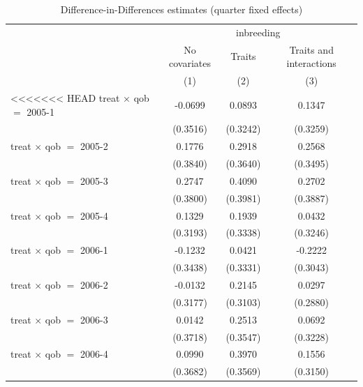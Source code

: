
\begin{table}[htbp]
   \caption{\label{tab:table3} Difference-in-Differences estimates (quarter fixed effects)}
   \bigskip
   \centering
   \begin{tabular}{lccc}
      \toprule
       & \multicolumn{3}{c}{inbreeding}\\
                                     & No covariates & Traits         & Traits and interactions \\   
                                     & (1)           & (2)            & (3)\\  
      \midrule 
<<<<<<< HEAD
      treat $\times$ qob $=$ 2005-1  & -0.0699       & 0.0893         & 0.1347\\   
                                     & (0.3516)      & (0.3242)       & (0.3259)\\   
      treat $\times$ qob $=$ 2005-2  & 0.1776        & 0.2918         & 0.2568\\   
                                     & (0.3840)      & (0.3640)       & (0.3495)\\   
      treat $\times$ qob $=$ 2005-3  & 0.2747        & 0.4090         & 0.2702\\   
                                     & (0.3800)      & (0.3981)       & (0.3887)\\   
      treat $\times$ qob $=$ 2005-4  & 0.1329        & 0.1939         & 0.0432\\   
                                     & (0.3193)      & (0.3338)       & (0.3246)\\   
      treat $\times$ qob $=$ 2006-1  & -0.1232       & 0.0421         & -0.2222\\   
                                     & (0.3438)      & (0.3331)       & (0.3043)\\   
      treat $\times$ qob $=$ 2006-2  & -0.0132       & 0.2145         & 0.0297\\   
                                     & (0.3177)      & (0.3103)       & (0.2880)\\   
      treat $\times$ qob $=$ 2006-3  & 0.0142        & 0.2513         & 0.0692\\   
                                     & (0.3718)      & (0.3547)       & (0.3228)\\   
      treat $\times$ qob $=$ 2006-4  & 0.0990        & 0.3970         & 0.1556\\   
                                     & (0.3682)      & (0.3569)       & (0.3150)\\   

\end{tabular}
\end{table}
